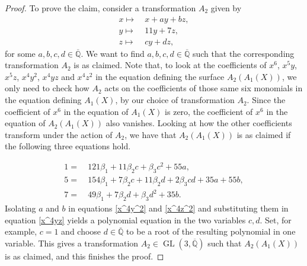 \documentclass[11pt]{amsart}
\newcommand{\QQ}{\mathbb{Q}}
\theoremstyle{plain}
\theoremstyle{remark}
\begin{document}
\begin{proof}
To prove the claim, consider a transformation $A_2$ given by
\begin{align*}
x \mapsto &  \ x+ay+bz, \\
y \mapsto & \  11y+7z, \\
z \mapsto & \ cy+dz,
\end{align*}
for some $a,b,c,d\in \overline{\QQ}$. We want to find $a,b,c,d\in \overline{\QQ}$ such that the corresponding transformation $A_2$ is as claimed. Note that, to look at the coefficients of $x^6$, $x^5y$, $x^5z$, $x^4y^2$, $x^4yz$ and $x^4z^2$ in the equation defining the surface $A_2(A_1(X))$, we only need to check how $A_2$ acts on the coefficients of those same six monomials in the equation defining $A_1(X)$, by our choice of transformation $A_2$. Since the coefficient of $x^6$ in the equation of $A_1(X)$ is zero, the coefficient of $x^6$ in the equation of $A_2(A_1(X))$ also vanishes. Looking at how the other coefficients transform under the action of $A_2$, we have that $A_2(A_1(X))$ is as claimed if the following three equations hold.

\begin{align} 
    1 = & \ 121\beta_1+11\beta_2c+\beta_3c^2+55a, \label{x^4y^2} \\
    5 = & \ 154\beta_1+7\beta_2c+11\beta_2d+2\beta_3cd+35a+55b, \label{x^4yz} \\
    7 = & \ 49\beta_1+7\beta_2d+\beta_3d^2+35b. \label{x^4z^2}
\end{align}
Isolating $a$ and $b$ in equations \eqref{x^4y^2} and \eqref{x^4z^2} and substituting them in equation \eqref{x^4yz} yields a polynomial equation in the two variables $c,d$. Set, for example, $c=1$ and choose $d\in \overline{\QQ}$ to be a root of the resulting polynomial in one variable. This gives a transformation $A_2\in \operatorname{GL}(3, \overline{\QQ})$ such that $A_2(A_1(X))$ is as claimed, and this finishes the proof. 
\end{proof}
\end{document}
